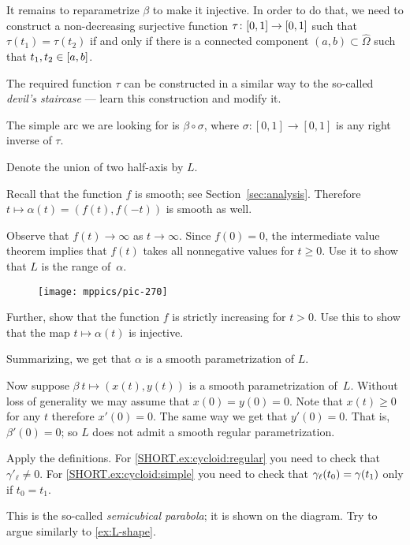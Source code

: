 It remains to reparametrize $\beta$ to make it injective.
In order to do that, we need to construct a non-decreasing surjective function $\tau\:[0,1]\z\to[0,1]$ such that 
$\tau(t_1)=\tau(t_2)$ if and only if there is a connected component $(a,b)\subset\hat \Omega$ such that $t_1,t_2\z\in [a,b]$.

The required function $\tau$ can be constructed in a similar way to the so-called {}\emph{devil's staircase} --- learn this construction and modify it.

The simple arc we are looking for is $\beta \circ \sigma$, where $\sigma:  [0,1]\to [0,1]$ is any right inverse of $\tau$.


Denote the union of two half-axis by $L$.

Recall that the function $f$ is smooth; see Section~\ref{sec:analysis}.
Therefore $t\mapsto \alpha(t)=(f(t),f(-t))$ is smooth as well.

Observe that $f(t)\to\infty$ as $t\to \infty$.
Since $f(0)=0$, the intermediate value theorem implies that $f(t)$ takes all nonnegative values for $t\ge 0$.
Use it to show that $L$ is the range of~$\alpha$.

\begin{wrapfigure}[12]{r}{24 mm}
\vskip-4mm
\centering
\texttt{[image: mppics/pic-270]}
\vskip0mm
\end{wrapfigure}

Further, show that the function $f$ is strictly increasing for $t> 0$.
Use this to show that the map $t\mapsto \alpha(t)$ is injective.

Summarizing, we get that $\alpha$ is a smooth parametrization of $L$. 

Now suppose $\beta\:t\mapsto (x(t),y(t))$ is a smooth parametrization of~$L$.
Without loss of generality we may assume that $x(0)=y(0)=0$.
Note that $x(t)\ge 0$ for any $t$ therefore $x'(0)=0$.
The same way we get that $y'(0)=0$.
That is, $\beta'(0)=0$;
so $L$ does not admit a smooth regular parametrization.

Apply the definitions.
For \ref{SHORT.ex:cycloid:regular} you need to check that $\gamma'_\ell\ne 0$.
For \ref{SHORT.ex:cycloid:simple} you need to check that $\gamma_\ell(t_0)\z=\gamma(t_1)$ only if $t_0=t_1$.

This is the so-called \emph{semicubical parabola}; it is shown on the diagram.
Try to argue similarly to \ref{ex:L-shape}.


